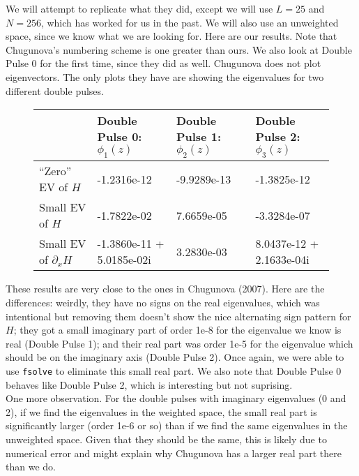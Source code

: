 \documentclass[12pt]{article}
\begin{document}
We will attempt to replicate what they did, except we will use $L = 25$ and $N = 256$, which has worked for us in the past. We will also use an unweighted space, since we know what we are looking for. Here are our results. Note that Chugunova's numbering scheme is one greater than ours. We also look at Double Pulse 0 for the first time, since they did as well. Chugunova does not plot eigenvectors. The only plots they have are showing the eigenvalues for two different double pulses.

\begin{figure}[H]
\begin{tabular}{l|l|l|l}
  & Double Pulse 0: $\phi_1(z)$ & Double Pulse 1: $\phi_2(z)$ & Double Pulse 2: $\phi_3(z)$  \\ \hline
``Zero'' EV of $H$             & -1.2316e-12    & -9.9289e-13  & -1.3825e-12 \\
Small EV of $H$                & -1.7822e-02    & 7.6659e-05  & -3.3284e-07 \\
Small EV of $\partial_x H$     & -1.3860e-11 + 5.0185e-02i & 3.2830e-03   & 8.0437e-12 + 2.1633e-04i \\ 
\end{tabular}
\end{figure}

These results are very close to the ones in Chugunova (2007). Here are the differences: weirdly, they have no signs on the real eigenvalues, which was intentional but removing them doesn't show the nice alternating sign pattern for $H$; they got a small imaginary part of order 1e-8 for the eigenvalue we know is real (Double Pulse 1); and their real part was order 1e-5 for the eigenvalue which should be on the imaginary axis (Double Pulse 2). Once again, we were able to use \texttt{fsolve} to eliminate this small real part. We also note that Double Pulse 0 behaves like Double Pulse 2, which is interesting but not suprising.\\

One more observation. For the double pulses with imaginary eigenvalues (0 and 2), if we find the eigenvalues in the weighted space, the small real part is significantly larger (order 1e-6 or so) than if we find the same eigenvalues in the unweighted space. Given that they should be the same, this is likely due to numerical error and might explain why Chugunova has a larger real part there than we do.
\end{document}
